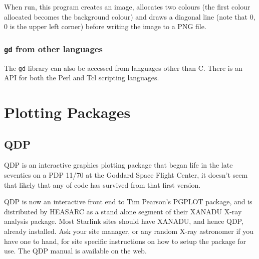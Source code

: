 \documentclass[twoside,11pt]{article}
\newcommand{\htmladdnormallink}[2]{#1}
\newcommand{\htmlref}[2]{#1}
\newcommand{\xlabel}[1]{}
\begin{document}
When run, this program creates an image, allocates two colours (the first colour allocated becomes the background colour) and draws a diagonal line
(note that 0, 0 is the upper left corner) before writing the image to a PNG file. 

\subsubsection{{\tt gd} from other languages}

The {\tt gd} library can also be accessed from languages other than C. There is an API for both the \htmladdnormallink{Perl}{http://stein.cshl.org/WWW/software/GD/GD.html} and \htmladdnormallink{Tcl}{http://www.tcltk.com/ftp/ellson/} scripting languages.

\section{\xlabel{sc15_packages}Plotting Packages\label{sc15_packages}}

\subsection{\xlabel{sc15_qdp}QDP\label{sc15_qdp}}

\htmladdnormallink{QDP}{http://heasarc.gsfc.nasa.gov/docs/software/ftools/others/qdp/node3.html} is an interactive graphics plotting package that began life in the late seventies on a PDP 11/70 at the Goddard Space Flight Center, it doesn't seem that likely that any of code has survived from that first version. 

QDP is now an interactive front end to Tim Pearson's \htmlref{PGPLOT}{sc15_pgplot} package, and is distributed by \htmladdnormallink{HEASARC}{http://heasarc.gsfc.nasa.gov/} as a stand alone segment of their \htmladdnormallink{XANADU}{http://heasarc.gsfc.nasa.gov/docs/xanadu/xanadu.html} X-ray analysis package. Most Starlink sites should have XANADU, and hence QDP, already installed. Ask your site manager, or any random X-ray astronomer if you have one to hand, for site specific instructions on how to setup the package for use. The QDP manual is available \htmladdnormallink{on the web}{http://heasarc.gsfc.nasa.gov/docs/software/ftools/others/qdp/node3.html}.
\end{document}
